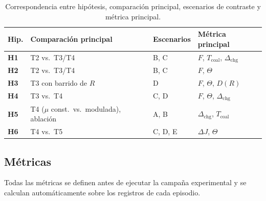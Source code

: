 \begin{table}[htbp]
\centering
\small
\caption[Hipótesis, comparaciones, escenarios y métricas]{Correspondencia entre
  hipótesis, comparación principal, escenarios de contraste y métrica principal.}
\label{tab:hipescenario}
\begin{tabularx}{\textwidth}{@{}>{\bfseries}p{}p{}p{}Y@{}}
\toprule
Hip. & Comparación principal & Escenarios & Métrica principal \\
\midrule
H1 & T2 vs.\ T3/T4 & B, C & $F$, $T_{\mathrm{coal}}$, $\Delta_{\mathrm{chg}}$ \\
H2 & T2 vs.\ T3/T4 & B, C & $F$, $\Theta$ \\
H3 & T3 con barrido de $R$ & D & $F$, $\Theta$, $D(R)$ \\
H4 & T3 vs.\ T4 & C, D & $F$, $\Theta$, $\Delta_{\mathrm{chg}}$ \\
H5 & T4 ($\mu$ const.\ vs.\ modulada), ablación & A, B &
  $\Delta_{\mathrm{chg}}$, $T_{\mathrm{coal}}$ \\
H6 & T4 vs.\ T5 & C, D, E & $\Delta J$, $\Theta$ \\
\bottomrule
\end{tabularx}
\end{table}

\subsection{Métricas}

Todas las métricas se definen antes de ejecutar la campaña experimental y se
calculan automáticamente sobre los registros de cada episodio.

